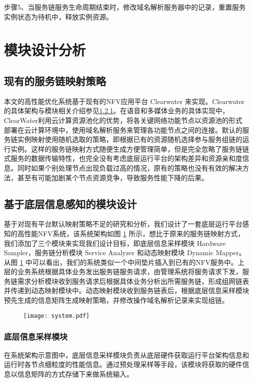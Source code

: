 步骤5、当服务链服务生命周期结束时，修改域名解析服务器中的记录，重置服务实例状态为待机中，释放实例资源。


\section{模块设计分析}
\subsection{现有的服务链映射策略}
本文的高性能优化系统基于现有的NFV应用平台 Clearwater 来实现。Clearwater的具体架构与模块相关介绍参见\ref{}。在语音和多媒体业务的具体实现中，ClearWater利用云计算资源池化的优势，将各关键网络功能节点以资源池的形式部署在云计算环境中，使用域名解析服务来管理各功能节点之间的连接。默认的服务链实例映射使用随机选取的策略，即根据已有的资源随机选择参与服务组链的运行实例。这样的服务链映射方式随便生成方便管理简单，但是完全忽略了服务链链式服务的数据传输特性，也完全没有考虑底层运行平台的架构差异和资源亲和度信息。同时如果个别处理节点出现负载过高的情况，原有的策略也没有有效的解决方法，甚至有可能加剧某个节点资源竞争，导致服务性能下降的后果。
\subsection{基于底层信息感知的模块设计}
基于对现有平台默认映射策略不足的研究和分析，我们设计了一套底层运行平台感知的高性能NFV系统，该系统架构如图 \ref{fig:system} 所示，想比于原来的服务链映射方式，我们添加了三个模块来实现我们设计目标，即底层信息采样模块 Hardware Sampler，服务链分析模块 Service Analyzer 和动态映射模块 Dynamic Mapper。从图 \ref{fig:system} 中可以看出，我们的系统类似一个中间垫片插入到已有的NFV服务中。上层的业务系统根据具体业务发出服务链服务请求，由管理系统将服务请求下发，服务链需求分析模块收到服务请求后根据具体业务分析出所需服务链，形成组网链表并传递到动态映射模块中。动态映射模块收到服务链表后，根据底层信息采样模块预先生成的信息矩阵生成映射策略，并修改操作域名解析记录来实现组链。
\begin{figure}[!htp]
	\label{fig:system}
	\centering
	\texttt{[image: system.pdf]}
\end{figure}
\subsubsection{底层信息采样模块}
在系统架构示意图中，底层信息采样模块负责从底层硬件获取运行平台架构信息和运行时各节点细粒度的性能信息。通过预处理采样等手段，该模块将获取的硬件信息以信息矩阵的方式存储下来做系统输入。

